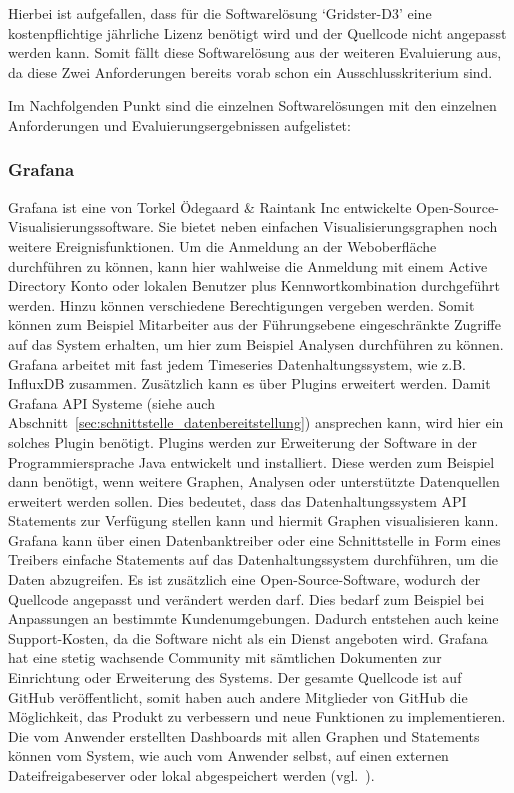 Hierbei ist aufgefallen, dass für die Softwarelösung `Gridster-D3' eine
kostenpflichtige jährliche Lizenz benötigt wird und der Quellcode nicht
angepasst werden kann. Somit fällt diese Softwarelösung aus der weiteren
Evaluierung aus, da diese Zwei Anforderungen bereits vorab schon ein
Ausschlusskriterium sind.

Im Nachfolgenden Punkt sind die einzelnen Softwarelösungen mit den einzelnen
Anforderungen und Evaluierungsergebnissen aufgelistet:
\mr%

\subsubsection{Grafana}
\label{subsubsec:grafana}
Grafana ist eine von Torkel Ödegaard \& Raintank Inc entwickelte
Open-Source-Visualisierungssoftware. Sie bietet neben einfachen
Visualisierungsgraphen noch weitere Ereignisfunktionen. Um die Anmeldung an der
Weboberfläche durchführen zu können, kann hier wahlweise die Anmeldung mit
einem \gls{Active Directory} Konto oder lokalen Benutzer plus
Kennwortkombination durchgeführt werden. Hinzu können verschiedene
Berechtigungen vergeben werden. Somit können zum Beispiel Mitarbeiter aus der
Führungsebene eingeschränkte Zugriffe auf das System erhalten, um hier zum
Beispiel Analysen durchführen zu können. Grafana arbeitet mit fast jedem
Timeseries Datenhaltungssystem, wie z.B. InfluxDB zusammen. Zusätzlich kann es
über Plugins erweitert werden. Damit Grafana API Systeme (siehe auch
Abschnitt~\ref{sec:schnittstelle_datenbereitstellung}) ansprechen kann, wird
hier ein solches Plugin benötigt. Plugins werden zur Erweiterung der Software
in der Programmiersprache Java entwickelt und installiert. Diese werden zum
Beispiel dann benötigt, wenn weitere Graphen, Analysen oder unterstützte
Datenquellen erweitert werden sollen. Dies bedeutet, dass das
Datenhaltungssystem API Statements zur Verfügung stellen kann und hiermit
Graphen visualisieren kann. Grafana kann über einen \gls{Datenbanktreiber} oder
eine Schnittstelle in Form eines Treibers einfache Statements auf das
Datenhaltungssystem durchführen, um die Daten abzugreifen. Es ist zusätzlich
eine Open-Source-Software, wodurch der Quellcode angepasst und verändert werden
darf. Dies bedarf zum Beispiel bei Anpassungen an bestimmte Kundenumgebungen.
Dadurch entstehen auch keine Support-Kosten, da die Software nicht als ein
Dienst angeboten wird. Grafana hat eine stetig wachsende Community mit
sämtlichen Dokumenten zur Einrichtung oder Erweiterung des Systems. Der gesamte
Quellcode ist auf GitHub veröffentlicht, somit haben auch andere Mitglieder von
GitHub die Möglichkeit, das Produkt zu verbessern und neue Funktionen zu
implementieren. Die vom Anwender erstellten Dashboards mit allen Graphen und
Statements können vom System, wie auch vom Anwender selbst, auf einen externen
Dateifreigabeserver oder lokal abgespeichert werden (vgl.~\cite{grafana}).

